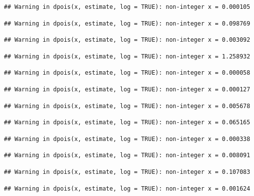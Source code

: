 \documentclass[]{article}
\begin{document}
\begin{verbatim}
## Warning in dpois(x, estimate, log = TRUE): non-integer x = 0.000105
\end{verbatim}

\begin{verbatim}
## Warning in dpois(x, estimate, log = TRUE): non-integer x = 0.098769
\end{verbatim}

\begin{verbatim}
## Warning in dpois(x, estimate, log = TRUE): non-integer x = 0.003092
\end{verbatim}

\begin{verbatim}
## Warning in dpois(x, estimate, log = TRUE): non-integer x = 1.258932
\end{verbatim}

\begin{verbatim}
## Warning in dpois(x, estimate, log = TRUE): non-integer x = 0.000058
\end{verbatim}

\begin{verbatim}
## Warning in dpois(x, estimate, log = TRUE): non-integer x = 0.000127
\end{verbatim}

\begin{verbatim}
## Warning in dpois(x, estimate, log = TRUE): non-integer x = 0.005678
\end{verbatim}

\begin{verbatim}
## Warning in dpois(x, estimate, log = TRUE): non-integer x = 0.065165
\end{verbatim}

\begin{verbatim}
## Warning in dpois(x, estimate, log = TRUE): non-integer x = 0.000338
\end{verbatim}

\begin{verbatim}
## Warning in dpois(x, estimate, log = TRUE): non-integer x = 0.008091
\end{verbatim}

\begin{verbatim}
## Warning in dpois(x, estimate, log = TRUE): non-integer x = 0.107083
\end{verbatim}

\begin{verbatim}
## Warning in dpois(x, estimate, log = TRUE): non-integer x = 0.001624
\end{verbatim}
\end{document}
